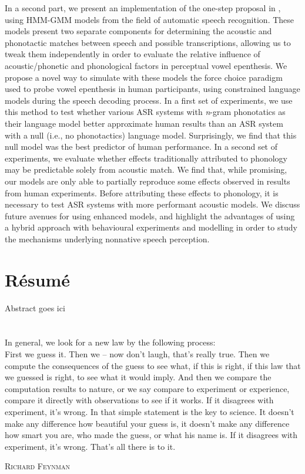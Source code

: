 \documentclass[12pt, twoside]{report}
\begin{document}
In a second part, we present an implementation of the one-step proposal in \cite{wilson2013}, using HMM-GMM models from the field of automatic speech recognition. These models present two separate components for determining the acoustic and phonotactic matches between speech and possible transcriptions, allowing us to tweak them independently in order to evaluate the relative influence of acoustic/phonetic and phonological factors in perceptual vowel epenthesis. We propose a novel way to simulate with these models the force choice paradigm used to probe vowel epenthesis in human participants, using constrained language models during the speech decoding process.
In a first set of experiments, we use this method to test whether various ASR systems with \textit{n}-gram phonotatics as their language model better approximate human results than an ASR system with a null (i.e., no phonotactics) language model. Surprisingly, we find that this null model was the best predictor of human performance. 
In a second set of experiments, we evaluate whether effects traditionally attributed to phonology may be predictable solely from acoustic match. We find that, while promising, our models are only able to partially reproduce some effects observed in results from human experiments. Before attributing these effects to phonology, it is necessary to test ASR systems with more performant acoustic models. We discuss future avenues for using enhanced models, and highlight the advantages of using a hybrid approach with behavioural experiments and modelling in order to study the mechanisms underlying nonnative speech perception.     

\chapter*{Résumé}
Abstract goes ici

\chapter*{}
\setlength{\epigraphwidth}{0.9\textwidth}

\epigraph{In general, we look for a new law by the following process: \\ First we guess it. Then we – now don't laugh, that's really true. Then we compute the consequences of the guess to see what, if this is right, if this law that we guessed is right, to see what it would imply. And then we compare the computation results to nature, or we say compare to experiment or experience, compare it directly with observations to see if it works. If it disagrees with experiment, it's wrong. In that simple statement is the key to science. It doesn't make any difference how beautiful your guess is, it doesn't make any difference how smart you are, who made the guess, or what his name is. If it disagrees with experiment, it's wrong. That's all there is to it.}{\textsc{Richard Feynman}}
\end{document}

